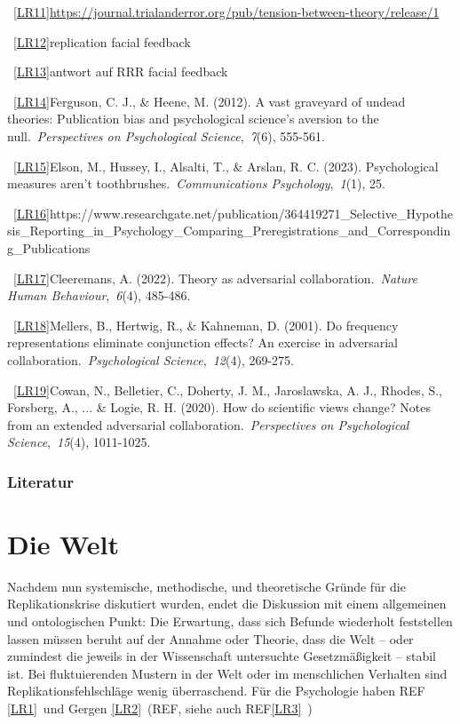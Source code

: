 \documentclass[
  letterpaper,
  DIV=11,
  numbers=noendperiod]{scrreprt}
\begin{document}
~\hyperref[_msoanchor_11]{{[}LR11{]}}\url{https://journal.trialanderror.org/pub/tension-between-theory/release/1}

~\hyperref[_msoanchor_12]{{[}LR12{]}}replication facial feedback

~\hyperref[_msoanchor_13]{{[}LR13{]}}antwort auf RRR facial feedback

~\hyperref[_msoanchor_14]{{[}LR14{]}}Ferguson, C. J., \& Heene, M.
(2012). A vast graveyard of undead theories: Publication bias and
psychological science's aversion to the null.~\emph{Perspectives on
Psychological Science},~\emph{7}(6), 555-561.

~\hyperref[_msoanchor_15]{{[}LR15{]}}Elson, M., Hussey, I., Alsalti, T.,
\& Arslan, R. C. (2023). Psychological measures aren't
toothbrushes.~\emph{Communications Psychology},~\emph{1}(1), 25.

~\hyperref[_msoanchor_16]{{[}LR16{]}}https://www.researchgate.net/publication/364419271\_Selective\_Hypothesis\_Reporting\_in\_Psychology\_Comparing\_Preregistrations\_and\_Corresponding\_Publications

~\hyperref[_msoanchor_17]{{[}LR17{]}}Cleeremans, A. (2022). Theory as
adversarial collaboration.~\emph{Nature Human Behaviour},~\emph{6}(4),
485-486.

~\hyperref[_msoanchor_18]{{[}LR18{]}}Mellers, B., Hertwig, R., \&
Kahneman, D. (2001). Do frequency representations eliminate conjunction
effects? An exercise in adversarial collaboration.~\emph{Psychological
Science},~\emph{12}(4), 269-275.

~\hyperref[_msoanchor_19]{{[}LR19{]}}Cowan, N., Belletier, C., Doherty,
J. M., Jaroslawska, A. J., Rhodes, S., Forsberg, A., ... \& Logie, R. H.
(2020). How do scientific views change? Notes from an extended
adversarial collaboration.~\emph{Perspectives on Psychological
Science},~\emph{15}(4), 1011-1025.

\subsection{Literatur}\label{literatur-13}

\chapter{Die Welt}\label{die-welt}

Nachdem nun systemische, methodische, und theoretische Gründe für die
Replikationskrise diskutiert wurden, endet die Diskussion mit einem
allgemeinen und ontologischen Punkt: Die Erwartung, dass sich Befunde
wiederholt feststellen lassen müssen beruht auf der Annahme oder
Theorie, dass die Welt -- oder zumindest die jeweils in der Wissenschaft
untersuchte Gesetzmäßigkeit -- stabil ist. Bei fluktuierenden Mustern in
der Welt oder im menschlichen Verhalten sind Replikationsfehlschläge
wenig überraschend. Für die Psychologie haben REF
\hyperref[_msocom_1]{{[}LR1{]}}~und Gergen
\hyperref[_msocom_2]{{[}LR2{]}}~(REF, siehe auch
REF\hyperref[_msocom_3]{{[}LR3{]}}~)
\end{document}
